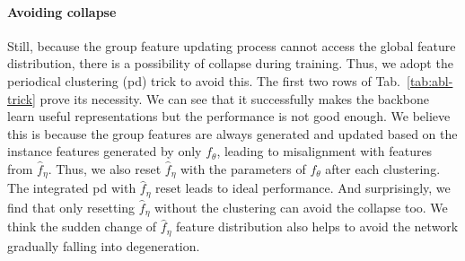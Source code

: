 \documentclass[runningheads]{style/llncs}
\begin{document}
\paragraph{Avoiding collapse}
Still, because the group feature updating process cannot access the global feature distribution, there is a possibility of collapse during training. Thus, we adopt the periodical clustering (pd) trick to avoid this. The first two rows of Tab.~\ref{tab:abl-trick} prove its necessity. We can see that it successfully makes the backbone learn useful representations but the performance is not good enough. We believe this is because the group features are always generated and updated based on the instance features generated by only $f_\theta$, leading to misalignment with features from $\hat f_\eta$. Thus, we also reset $\hat f_\eta$ with the parameters of $f_\theta$ after each clustering. The integrated pd with $\hat f_\eta$ reset leads to ideal performance. And surprisingly, we find that only resetting $\hat f_\eta$ without the clustering can avoid the collapse too. We think the sudden change of $\hat f_\eta$ feature distribution also helps to avoid the network gradually falling into degeneration. 
\end{document}
